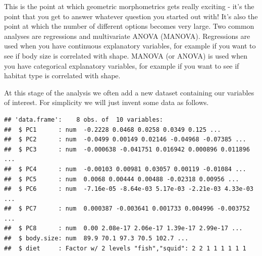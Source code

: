 \documentclass[]{book}
\newenvironment{Shaded}{\begin{snugshade}}{\end{snugshade}}
\newcommand{\KeywordTok}[1]{\textcolor[rgb]{0.13,0.29,0.53}{\textbf{{#1}}}}
\newcommand{\DataTypeTok}[1]{\textcolor[rgb]{0.13,0.29,0.53}{{#1}}}
\newcommand{\DecValTok}[1]{\textcolor[rgb]{0.00,0.00,0.81}{{#1}}}
\newcommand{\StringTok}[1]{\textcolor[rgb]{0.31,0.60,0.02}{{#1}}}
\newcommand{\CommentTok}[1]{\textcolor[rgb]{0.56,0.35,0.01}{\textit{{#1}}}}
\newcommand{\NormalTok}[1]{{#1}}
\begin{document}
This is the point at which geometric morphometrics gets really exciting
- it's the point that you get to answer whatever question you started
out with! It's also the point at which the number of different options
becomes very large. Two common analyses are regressions and multivariate
ANOVA (MANOVA). Regressions are used when you have continuous
explanatory variables, for example if you want to see if body size is
correlated with shape. MANOVA (or ANOVA) is used when you have
categorical explanatory variables, for example if you want to see if
habitat type is correlated with shape.

At this stage of the analysis we often add a new dataset containing our
variables of interest. For simplicity we will just invent some data as
follows.

\begin{Shaded}
\end{Shaded}

\begin{verbatim}
## 'data.frame':    8 obs. of  10 variables:
##  $ PC1      : num  -0.2228 0.0468 0.0258 0.0349 0.125 ...
##  $ PC2      : num  -0.0499 0.00149 0.02146 -0.04968 -0.07385 ...
##  $ PC3      : num  -0.000638 -0.041751 0.016942 0.000896 0.011896 ...
##  $ PC4      : num  -0.00103 0.00981 0.03057 0.00119 -0.01084 ...
##  $ PC5      : num  0.0068 0.00444 0.00488 -0.02318 0.00956 ...
##  $ PC6      : num  -7.16e-05 -8.64e-03 5.17e-03 -2.21e-03 4.33e-03 ...
##  $ PC7      : num  0.000387 -0.003641 0.001733 0.004996 -0.003752 ...
##  $ PC8      : num  0.00 2.08e-17 2.06e-17 1.39e-17 2.99e-17 ...
##  $ body.size: num  89.9 70.1 97.3 70.5 102.7 ...
##  $ diet     : Factor w/ 2 levels "fish","squid": 2 2 1 1 1 1 1 1
\end{verbatim}
\end{document}
